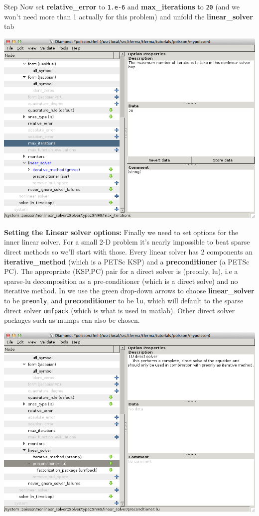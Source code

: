 \begin{steps}{Step}
Now set \textbf{relative\_error} to \texttt{1.e-6} and
\textbf{max\_iterations} to \texttt{20} (and we won't need more than 1
actually for this problem) and unfold the \textbf{linear\_solver} tab
\begin{center}
    \includegraphics[width=\diamondwidth]{figures/screendumps/diamond_poisson_11e.png}
\end{center}
\item \textbf{Setting the Linear solver options:} Finally we need to
  set options for the inner linear solver.  For a small 2-D problem
  it's nearly impossible to beat sparse direct methods so we'll start
  with those.  Every linear solver has 2 components an
  \textbf{iterative\_method} (which is a PETSc KSP) and a
  \textbf{preconditioner} (a PETSc PC).  The appropriate (KSP,PC)
  pair for a direct solver is (preonly, lu), i.e a sparse-lu decomposition as
  a pre-conditioner (which is a direct solve) and no iterative
  method.  In \TF{} we use the green drop-down arrows to choose
  \textbf{linear\_solver} to be \texttt{preonly}, and
  \textbf{preconditioner} to be \texttt{lu}, which will default to the
  sparse direct solver \texttt{umfpack} (which is what is used in
  matlab).  Other direct solver packages such as mumps can also be chosen.
\begin{center}
    \includegraphics[width=\diamondwidth]{figures/screendumps/diamond_poisson_12a.png}

\end{center}
\end{steps}
